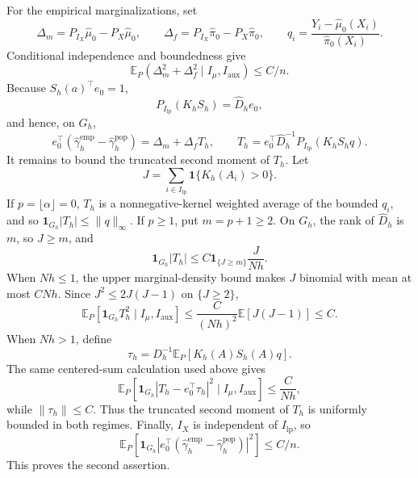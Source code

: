 For the empirical marginalizations, set
\[
\Delta_m=P_{I_X}\widehat\mu_0-P_X\widehat\mu_0,
\qquad
\Delta_f=P_{I_X}\widehat\pi_0-P_X\widehat\pi_0,
\qquad
q_i=\frac{Y_i-\widehat\mu_0(X_i)}{\widehat\pi_0(X_i)}.
\]
Conditional independence and boundedness give
\[
\mathbb E_P(\Delta_m^2+\Delta_f^2\mid I_\mu,I_{\mathrm{aux}})\le C/n.
\]
Because \(S_h(a)^\top e_0=1\),
\[
P_{I_{\mathrm{lp}}}(K_hS_h)=\widehat D_he_0,
\]
and hence, on \(G_h\),
\[
e_0^\top(\widehat\gamma_h^{\mathrm{emp}}-\widehat\gamma_h^{\mathrm{pop}})
=
\Delta_m+\Delta_fT_h,
\qquad
T_h=e_0^\top\widehat D_h^{-1}P_{I_{\mathrm{lp}}}(K_hS_hq).
\]
It remains to bound the truncated second moment of \(T_h\). Let
\[
J=\sum_{i\in I_{\mathrm{lp}}}\mathbf1\{K_h(A_i)>0\}.
\]
If \(p=\lfloor\alpha\rfloor=0\), \(T_h\) is a nonnegative-kernel weighted average of the bounded \(q_i\), and so \(\mathbf1_{G_h}|T_h|\le\|q\|_\infty\). If \(p\ge1\), put \(m=p+1\ge2\). On \(G_h\), the rank of \(\widehat D_h\) is \(m\), so \(J\ge m\), and
\[
\mathbf1_{G_h}|T_h|
\le C\mathbf1_{\{J\ge m\}}\frac{J}{Nh}.
\]
When \(Nh\le1\), the upper marginal-density bound makes \(J\) binomial with mean at most \(CNh\). Since \(J^2\le2J(J-1)\) on \(\{J\ge2\}\),
\[
\mathbb E_P[\mathbf1_{G_h}T_h^2\mid I_\mu,I_{\mathrm{aux}}]
\le\frac{C}{(Nh)^2}\mathbb E[J(J-1)]\le C.
\]
When \(Nh>1\), define
\[
\tau_h=D_h^{-1}\mathbb E_P[K_h(A)S_h(A)q].
\]
The same centered-sum calculation used above gives
\[
\mathbb E_P[\mathbf1_{G_h}|T_h-e_0^\top\tau_h|^2\mid I_\mu,I_{\mathrm{aux}}]
\le\frac{C}{Nh},
\]
while \(\|\tau_h\|\le C\). Thus the truncated second moment of \(T_h\) is uniformly bounded in both regimes. Finally, \(I_X\) is independent of \(I_{\mathrm{lp}}\), so
\[
\mathbb E_P[\mathbf1_{G_h}|e_0^\top(\widehat\gamma_h^{\mathrm{emp}}-
\widehat\gamma_h^{\mathrm{pop}})|^2]
\le C/n.
\]
This proves the second assertion.